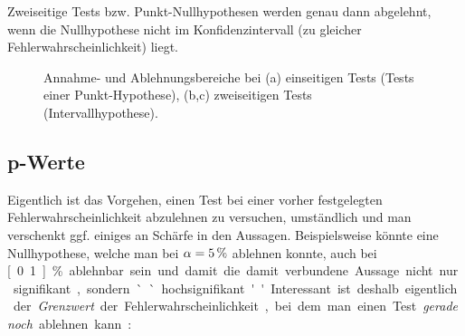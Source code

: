 


%
Zweiseitige Tests bzw. Punkt-Nullhypothesen werden genau dann
abgelehnt, wenn die Nullhypothese nicht im Konfidenzintervall (zu
gleicher Fehlerwahrscheinlichkeit) liegt.

\begin{figure}
\caption{\label{fig:test-einZweiseitig}Annahme- und Ablehnungsbereiche
bei (a) einseitigen Tests (Tests einer Punkt-Hypothese), (b,c)
zweiseitigen  Tests (Intervallhypothese). 
}
\end{figure}


\subsection{\label{sec:pWert}p-Werte} 
Eigentlich ist das Vorgehen, einen Test bei einer vorher festgelegten
Fehlerwahrscheinlichkeit abzulehnen zu versuchen,
umst\"andlich und man verschenkt ggf. einiges an Sch\"arfe in den
Aussagen. Beispielsweise k\"onnte eine Nullhypothese, welche man bei
$\alpha=\unit[5]{\%}$ ablehnen konnte, auch bei \unit[0.1]{\%}
ablehnbar sein und damit die damit verbundene Aussage nicht nur
signifikant, sondern ``hochsignifikant''. 
Interessant ist deshalb eigentlich der \emph{Grenzwert} der
Fehlerwahrscheinlichkeit, bei dem man einen Test \emph{gerade noch}
ablehnen kann:

